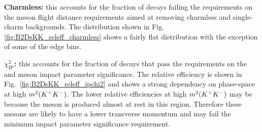 \begin{description}

\item \textbf{Charmless:} this accounts for the fraction of decays failing the requirements on the \D meson flight distance requirements aimed at removing charmless and single-charm backgrounds. The distribution shown in Fig.\ref{fig:B2DsKK_releff_charmless} shows a fairly flat distribution with the exception of some of the edge bins.
\item \textbf{$\chi^{2}_{\text{IP}}$:} this accounts for the fraction of decays that pass the requirements on the \Bp and \Dsp meson impact parameter significance. The relative efficiency is shown in Fig.~\ref{fig:B2DsKK_releff_ipchi2} and shows a strong dependency on phase-space at high $m^{2}({{K}^+}{{K}^-})$. The lower relative efficiencies at high $m^{2}({{K}^+}{{K}^-})$ may be because the \Dsp meson is produced almost at rest in this region. Therefore these \Dsp mesons are likely to have a lower transverse momentum and may fail the minimum impact parameter significance requirement.
\end{description}

